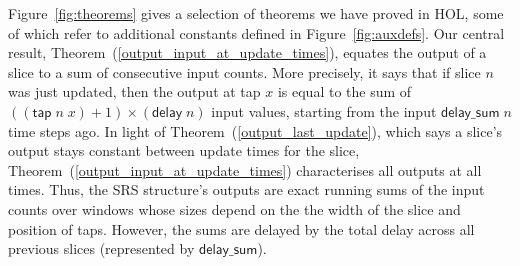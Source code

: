 \documentclass{llncs}
\begin{document}
Figure~\ref{fig:theorems} gives a selection of theorems we have proved in HOL, some of which refer to additional constants defined in Figure~\ref{fig:auxdefs}.
Our central result, Theorem~(\ref{output_input_at_update_times}), equates the output of a slice to a sum of consecutive input counts.
More precisely, it says that if slice $n$ was just updated, then the output at tap $x$ is equal to the sum of $((\mathsf{tap}\;n\;x)+1)\times(\mathsf{delay}\;n)$ input values, starting from the input $\mathsf{delay\_sum}\;n$ time steps ago.
In light of Theorem~(\ref{output_last_update}), which says a slice's output stays constant between update times for the slice, Theorem~(\ref{output_input_at_update_times}) characterises all outputs at all times.
Thus, the SRS structure's outputs are exact running sums of the input counts over windows whose sizes depend on the the width of the slice and position of taps.
However, the sums are delayed by the total delay across all previous slices (represented by $\mathsf{delay\_sum}$).
\end{document}
